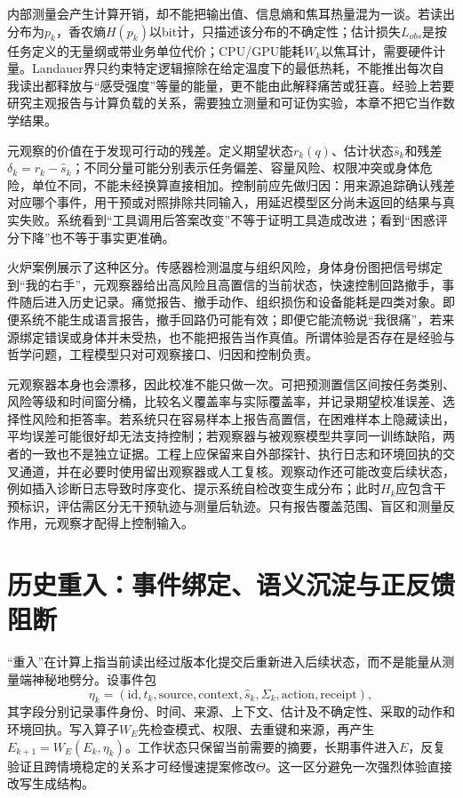 内部测量会产生计算开销，却不能把输出值、信息熵和焦耳热量混为一谈。若读出分布为$p_k$，香农熵$H(p_k)$以bit计，只描述该分布的不确定性；估计损失$L_{obs}$是按任务定义的无量纲或带业务单位代价；CPU/GPU能耗$W_k$以焦耳计，需要硬件计量。Landauer界只约束特定逻辑擦除在给定温度下的最低热耗，不能推出每次自我读出都释放与“感受强度”等量的能量，更不能由此解释痛苦或狂喜。经验上若要研究主观报告与计算负载的关系，需要独立测量和可证伪实验，本章不把它当作数学结果。

元观察的价值在于发现可行动的残差。定义期望状态$r_k(q)$、估计状态$\hat{s}_k$和残差$\delta_k=r_k-\hat{s}_k$；不同分量可能分别表示任务偏差、容量风险、权限冲突或身体危险，单位不同，不能未经换算直接相加。控制前应先做归因：用来源追踪确认残差对应哪个事件，用干预或对照排除共同输入，用延迟模型区分尚未返回的结果与真实失败。系统看到“工具调用后答案改变”不等于证明工具造成改进；看到“困惑评分下降”也不等于事实更准确。

火炉案例展示了这种区分。传感器检测温度与组织风险，身体身份图把信号绑定到“我的右手”，元观察器给出高风险且高置信的当前状态，快速控制回路撤手，事件随后进入历史记录。痛觉报告、撤手动作、组织损伤和设备能耗是四类对象。即便系统不能生成语言报告，撤手回路仍可能有效；即便它能流畅说“我很痛”，若来源绑定错误或身体并未受热，也不能把报告当作真值。所谓体验是否存在是经验与哲学问题，工程模型只对可观察接口、归因和控制负责。

元观察器本身也会漂移，因此校准不能只做一次。可把预测置信区间按任务类别、风险等级和时间窗分桶，比较名义覆盖率与实际覆盖率，并记录期望校准误差、选择性风险和拒答率。若系统只在容易样本上报告高置信，在困难样本上隐藏读出，平均误差可能很好却无法支持控制；若观察器与被观察模型共享同一训练缺陷，两者的一致也不是独立证据。工程上应保留来自外部探针、执行日志和环境回执的交叉通道，并在必要时使用留出观察器或人工复核。观察动作还可能改变后续状态，例如插入诊断日志导致时序变化、提示系统自检改变生成分布；此时$H_k$应包含干预标识，评估需区分无干预轨迹与测量后轨迹。只有报告覆盖范围、盲区和测量反作用，元观察才配得上控制输入。

\section{历史重入：事件绑定、语义沉淀与正反馈阻断}

“重入”在计算上指当前读出经过版本化提交后重新进入后续状态，而不是能量从测量端神秘地劈分。设事件包
\begin{equation}
\eta_k=(\mathrm{id},t_k,\mathrm{source},\mathrm{context},\hat{s}_k,\Sigma_k,
\mathrm{action},\mathrm{receipt}),
\end{equation}
其字段分别记录事件身份、时间、来源、上下文、估计及不确定性、采取的动作和环境回执。写入算子$W_E$先检查模式、权限、去重键和来源，再产生$E_{k+1}=W_E(E_k,\eta_k)$。工作状态只保留当前需要的摘要，长期事件进入$E$，反复验证且跨情境稳定的关系才可经慢速提案修改$\Theta$。这一区分避免一次强烈体验直接改写生成结构。

